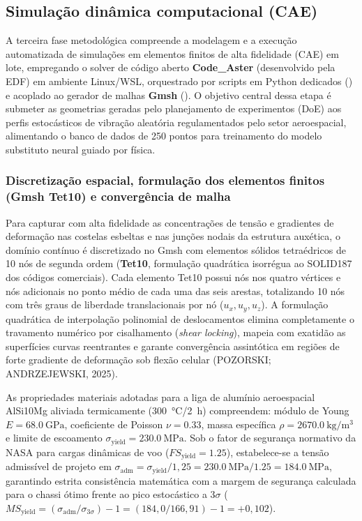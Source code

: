 \subsection{Simulação dinâmica computacional (CAE)}
\label{subsec:cae}

A terceira fase metodológica compreende a modelagem e a execução automatizada de simulações em elementos finitos de alta fidelidade (CAE) em lote, empregando o solver de código aberto \textbf{Code\_Aster} (desenvolvido pela EDF) em ambiente Linux/WSL, orquestrado por scripts em Python dedicados () e acoplado ao gerador de malhas \textbf{Gmsh} (). O objetivo central dessa etapa é submeter as geometrias geradas pelo planejamento de experimentos (DoE) aos perfis estocásticos de vibração aleatória regulamentados pelo setor aeroespacial, alimentando o banco de dados de 250 pontos para treinamento do modelo substituto neural guiado por física.

\subsubsection{Discretização espacial, formulação dos elementos finitos (Gmsh Tet10) e convergência de malha}
\label{subsubsec:solid187}

Para capturar com alta fidelidade as concentrações de tensão e gradientes de deformação nas costelas esbeltas e nas junções nodais da estrutura auxética, o domínio contínuo é discretizado no Gmsh com elementos sólidos tetraédricos de 10 nós de segunda ordem (\textbf{Tet10}, formulação quadrática isorrégua ao SOLID187 dos códigos comerciais). Cada elemento Tet10 possui nós nos quatro vértices e nós adicionais no ponto médio de cada uma das seis arestas, totalizando 10 nós com três graus de liberdade translacionais por nó ($u_x, u_y, u_z$). A formulação quadrática de interpolação polinomial de deslocamentos elimina completamente o travamento numérico por cisalhamento (\textit{shear locking}), mapeia com exatidão as superfícies curvas reentrantes e garante convergência assintótica em regiões de forte gradiente de deformação sob flexão celular (POZORSKI; ANDRZEJEWSKI, 2025).

As propriedades materiais adotadas para a liga de alumínio aeroespacial AlSi10Mg aliviada termicamente (\SI{300}{\celsius}/\SI{2}{\hour}) compreendem: módulo de Young $E = \SI{68.0}{\giga\pascal}$, coeficiente de Poisson $\nu = \num{0.33}$, massa específica $\rho = \SI{2670.0}{\kilo\gram\per\cubic\metre}$ e limite de escoamento $\sigma_{\text{yield}} = \SI{230.0}{\mega\pascal}$. Sob o fator de segurança normativo da NASA para cargas dinâmicas de voo ($FS_{\text{yield}} = \num{1.25}$), estabelece-se a tensão admissível de projeto em $\sigma_{\text{adm}} = \sigma_{\text{yield}} / 1{,}25 = \SI{230.0}{\mega\pascal} / \num{1.25} = \SI{184.0}{\mega\pascal}$, garantindo estrita consistência matemática com a margem de segurança calculada para o chassi ótimo frente ao pico estocástico a $3\sigma$ ($MS_{\text{yield}} = (\sigma_{\text{adm}} / \sigma_{3\sigma}) - 1 = (184{,}0 / 166{,}91) - 1 = +0{,}102$).

